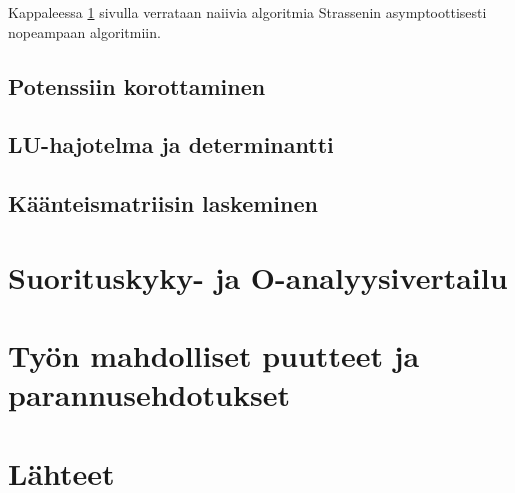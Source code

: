 \documentclass[10pt,a4paper]{article}
\newcommand{\pseudo}[1]{{\small}}
\begin{document}
Kappaleessa \ref{sec:vertailu} sivulla \pageref{sec:vertailu} verrataan naiivia algoritmia Strassenin asymptoottisesti
nopeampaan algoritmiin.

\subsection{Potenssiin korottaminen}

\pseudo{pow}

\subsection{LU-hajotelma ja determinantti}

\pseudo{LU}

\subsection{Käänteismatriisin laskeminen}

\pseudo{inv}


\section{Suorituskyky- ja O-analyysivertailu}\label{sec:vertailu}


\section{Työn mahdolliset puutteet ja parannusehdotukset}


\section{Lähteet}
\end{document}
